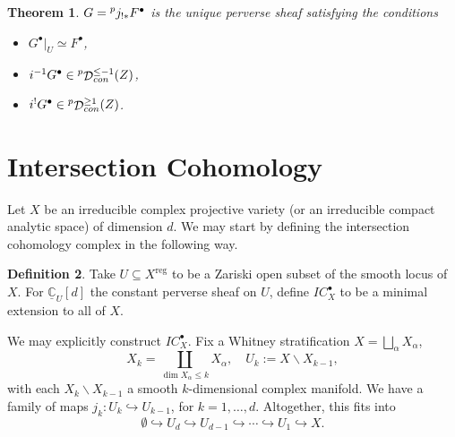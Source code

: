 \documentclass[12pt]{amsart}
\newcommand{\C}{\mathbb{C}}
\DeclareMathOperator{\D}{\mathcal{D}}
\newtheorem{theorem}{Theorem}[section]
\theoremstyle{definition}
\newtheorem{definition}[theorem]{Definition}
\theoremstyle{remark}
\numberwithin{equation}{section}
\begin{document}
\begin{theorem} \label{minimal-characterization}
    $G = \prescript{p}{}{j_{!*}} F^\bullet$ is the unique perverse sheaf 
    satisfying the conditions
    \begin{itemize}
        \item[(i)] $G^\bullet|_U \simeq F^\bullet$,
        \item[(ii)] $i^{-1} G^\bullet \in 
        \prescript{p}{}{\D}^{\leq -1}_{con}(Z)$,
        \item[(iii)] \(i^! G^\bullet \in 
        \prescript{p}{}{\D}^{\geq 1}_{con}(Z)\).
    \end{itemize}
\end{theorem}




\section{Intersection Cohomology}

Let $X$ be an irreducible complex projective variety (or an irreducible compact analytic space) of dimension $d$. We may start by defining the intersection cohomology complex in the following way.
\begin{definition}
    Take $U \subseteq X^{\text{reg}}$ to be a Zariski open subset of the smooth locus of $X$. For $\underline{\C}_U[d]$ the constant perverse sheaf on $U$, define $IC_X^{\bullet}$ to be a minimal extension to all of $X$.
\end{definition}

We may explicitly construct $IC_X^{\bullet}$. Fix a Whitney stratification $X = \bigsqcup_\alpha X_{\alpha}$, 
\begin{equation}
    X_k = \coprod_{\dim X_\alpha \leq k} X_\alpha, \quad U_k := X \smallsetminus X_{k-1},
\end{equation}
with each $X_k \smallsetminus X_{k-1}$ a smooth $k$-dimensional complex manifold. We have a family of maps $j_k: U_k \hookrightarrow U_{k-1}$, for $k=1,\dots, d$. Altogether, this fits into
\begin{equation}
    \emptyset \hookrightarrow U_d \hookrightarrow U_{d-1} \hookrightarrow \cdots
    \hookrightarrow U_1 \hookrightarrow X.
\end{equation}
\end{document}
